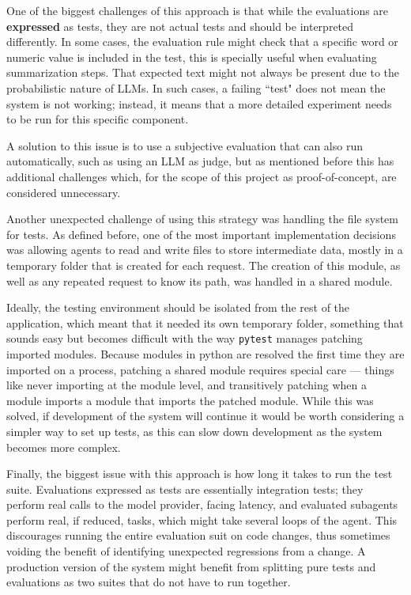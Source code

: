 \documentclass[a4paper]{report}
\begin{document}
One of the biggest challenges of this approach is that while the evaluations are \textbf{expressed} as tests, they are not actual tests and should be interpreted differently. In some cases, the evaluation rule might check that a specific word or numeric value is included in the test, this is specially useful when evaluating summarization steps. That expected text might not always be present due to the probabilistic nature of LLMs. In such cases, a failing ``test" does not mean the system is not working; instead, it means that a more detailed experiment needs to be run for this specific component.

A solution to this issue is to use a subjective evaluation that can also run automatically, such as using an LLM as judge, but as mentioned before this has additional challenges which, for the scope of this project as proof-of-concept, are considered unnecessary.

Another unexpected challenge of using this strategy was handling the file system for tests. As defined before, one of the most important implementation decisions was allowing agents to read and write files to store intermediate data, mostly in a temporary folder that is created for each request. The creation of this module, as well as any repeated request to know its path, was handled in a shared module.

Ideally, the testing environment should be isolated from the rest of the application, which meant that it needed its own temporary folder, something that sounds easy but becomes difficult with the way \texttt{pytest} manages patching imported modules. Because modules in python are resolved the first time they are imported on a process, patching a shared module requires special care --- things like never importing at the module level, and transitively patching when a module imports a module that imports the patched module. While this was solved, if development of the system will continue it would be worth considering a simpler way to set up tests, as this can slow down development as the system becomes more complex.

Finally, the biggest issue with this approach is how long it takes to run the test suite. Evaluations expressed as tests are essentially integration tests; they perform real calls to the model provider, facing latency, and evaluated subagents perform real, if reduced, tasks, which might take several loops of the agent. This discourages running the entire evaluation suit on code changes, thus sometimes voiding the benefit of identifying unexpected regressions from a change. A production version of the system might benefit from splitting pure tests and evaluations as two suites that do not have to run together.
\end{document}
